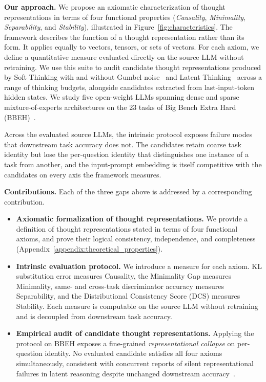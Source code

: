 \textbf{Our approach.} We propose an axiomatic characterization of thought representations in terms of four functional properties (\emph{Causality}, \emph{Minimality}, \emph{Separability}, and \emph{Stability}), illustrated in Figure~\ref{fig:characteristics}. The framework describes the function of a thought representation rather than its form. It applies equally to vectors, tensors, or sets of vectors. For each axiom, we define a quantitative measure evaluated directly on the source LLM without retraining. We use this suite to audit candidate thought representations produced by Soft Thinking with and without Gumbel noise~\citep{zhang2025softthinkingunlockingreasoning, wu2026llms} and Latent Thinking~\citep{hao2024training, zou2025latentcollaborationmultiagentsystems} across a range of thinking budgets, alongside candidates extracted from last-input-token hidden states. We study five open-weight LLMs spanning dense and sparse mixture-of-experts architectures on the 23 tasks of Big Bench Extra Hard (BBEH)~\citep{kazemi2025bigbenchextrahard}.

Across the evaluated source LLMs, the intrinsic protocol exposes failure modes that downstream task accuracy does not. The candidates retain coarse task identity but lose the per-question identity that distinguishes one instance of a task from another, and the input-prompt embedding is itself competitive with the candidates on every axis the framework measures.

\textbf{Contributions.} Each of the three gaps above is addressed by a corresponding contribution.
\begin{itemize}
    \item \textbf{Axiomatic formalization of thought representations.} We provide a definition of thought representations stated in terms of four functional axioms, and prove their logical consistency, independence, and completeness (Appendix~\ref{appendix:theoretical_properties}).
    \item \textbf{Intrinsic evaluation protocol.} We introduce a measure for each axiom. KL substitution error measures Causality, the Minimality Gap measures Minimality, same- and cross-task discriminator accuracy measures Separability, and the Distributional Consistency Score (DCS) measures Stability. Each measure is computable on the source LLM without retraining and is decoupled from downstream task accuracy.
    \item \textbf{Empirical audit of candidate thought representations.} Applying the protocol on BBEH exposes a fine-grained \emph{representational collapse} on per-question identity. No evaluated candidate satisfies all four axioms simultaneously, consistent with concurrent reports of silent representational failures in latent reasoning despite unchanged downstream accuracy~\citep{sahoo2026when}.
\end{itemize}

